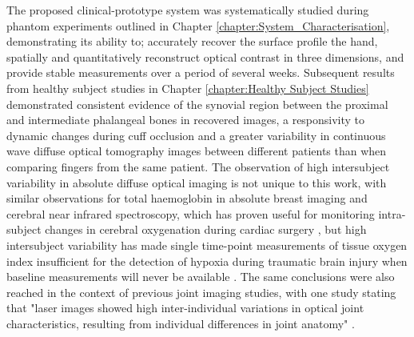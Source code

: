 \documentclass[twoside]{bhamthesis}
\theoremstyle{definition}
\begin{document}
The proposed clinical-prototype system was systematically studied during phantom experiments outlined in Chapter \ref{chapter:System_Characterisation}, demonstrating its ability to; accurately recover the surface profile the hand, spatially and quantitatively reconstruct optical contrast in three dimensions, and provide stable measurements over a period of several weeks. Subsequent results from healthy subject studies in Chapter \ref{chapter:Healthy Subject Studies} demonstrated consistent evidence of the synovial region between the proximal and intermediate phalangeal bones in recovered images, a responsivity to dynamic changes during cuff occlusion and a greater variability in continuous wave diffuse optical tomography images between different patients than when comparing fingers from the same patient. The observation of high intersubject variability in absolute diffuse optical imaging is not unique to this work, with similar observations for total haemoglobin in absolute breast imaging \cite{shah2001noninvasive,cubeddu2000effects} and cerebral near infrared spectroscopy, which has proven useful for monitoring intra-subject changes in cerebral oxygenation during cardiac surgery \cite{fedorow2010cerebral}, but high intersubject variability has made single time-point measurements of tissue oxygen index insufficient for the detection of hypoxia during traumatic brain injury when baseline measurements will never be available \cite{lighter2016assessing,davies2017frequency}. The same conclusions were also reached in the context of previous joint imaging studies, with one study stating that "laser images showed high inter-individual variations in optical joint characteristics, resulting from individual differences in joint anatomy" \cite{schwaighofer2003classification}.
\end{document}
